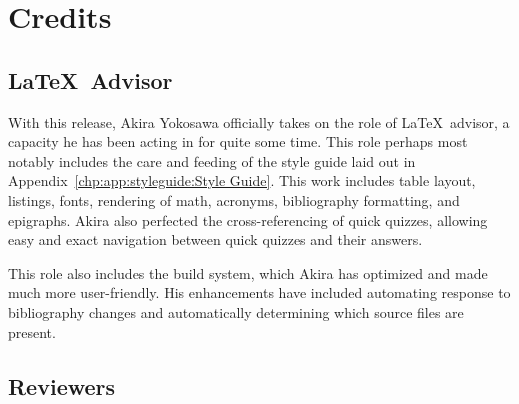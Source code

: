 
\chapter{Credits}
\label{app:ack:Credits}
%



\section{\LaTeX\ Advisor}

With this release, Akira Yokosawa officially takes on the role of
\LaTeX\ advisor, a capacity he has been acting in for quite some time.
This role perhaps most notably includes the care and feeding of the style
guide laid out in Appendix~\ref{chp:app:styleguide:Style Guide}.
This work includes table layout, listings, fonts, rendering of math,
acronyms, bibliography formatting, and epigraphs.
Akira also perfected the cross-referencing of quick quizzes, allowing
easy and exact navigation between quick quizzes and their answers.

This role also includes the build system, which Akira has optimized and
made much more user-friendly.
His enhancements have included automating response to bibliography
changes and automatically determining which source files are present.

\section{Reviewers}

